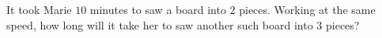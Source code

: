 It took Marie $10$ minutes to saw a board into $2$ pieces. Working at the same speed, how long will it take her to saw another such board into $3$ pieces?
